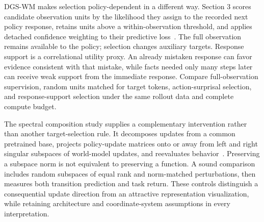 DGS-WM makes selection policy-dependent in a different way. Section 3 scores candidate observation units by the likelihood they assign to the recorded next policy response, retains units above a within-observation threshold, and applies detached confidence weighting to their predictive loss~\cite{rewrite_selectivewm2026}. The full observation remains available to the policy; selection changes auxiliary targets. Response support is a correlational utility proxy. An already mistaken response can favor evidence consistent with that mistake, while facts needed only many steps later can receive weak support from the immediate response. Compare full-observation supervision, random units matched for target tokens, action-surprisal selection, and response-support selection under the same rollout data and complete compute budget.

The spectral composition study supplies a complementary intervention rather than another target-selection rule. It decomposes updates from a common pretrained base, projects policy-update matrices onto or away from left and right singular subspaces of world-model updates, and reevaluates behavior~\cite{rewrite_wmcomposition2026}. Preserving a subspace norm is not equivalent to preserving a function. A sound comparison includes random subspaces of equal rank and norm-matched perturbations, then measures both transition prediction and task return. These controls distinguish a consequential update direction from an attractive representation visualization, while retaining architecture and coordinate-system assumptions in every interpretation.
